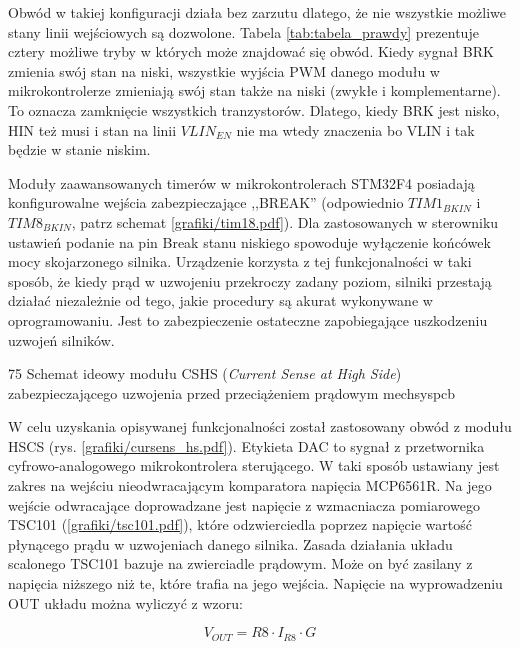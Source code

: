 Obwód w takiej konfiguracji działa bez zarzutu dlatego, że nie wszystkie możliwe stany linii wejściowych są dozwolone. Tabela \ref{tab:tabela_prawdy} prezentuje cztery możliwe tryby w których może znajdować się obwód. Kiedy sygnał BRK zmienia swój stan na niski, wszystkie wyjścia PWM danego modułu w mikrokontrolerze zmieniają swój stan także na niski (zwykłe i komplementarne). To oznacza zamknięcie wszystkich tranzystorów. Dlatego, kiedy BRK jest nisko, HIN też musi i stan na linii $ VLIN_{EN} $ nie ma wtedy znaczenia bo VLIN i tak będzie w stanie niskim.

\clearpage


Moduły zaawansowanych timerów w mikrokontrolerach STM32F4 posiadają konfigurowalne wejścia zabezpieczające ,,BREAK'' (odpowiednio $ TIM1_{BKIN} $ i $ TIM8_{BKIN} $, patrz schemat \ref{grafiki/tim18.pdf}). Dla zastosowanych w sterowniku ustawień podanie na pin Break stanu niskiego spowoduje wyłączenie końcówek mocy skojarzonego silnika. Urządzenie korzysta z tej funkcjonalności w taki sposób, że kiedy prąd w uzwojeniu przekroczy zadany poziom, silniki przestają działać niezależnie od tego, jakie procedury są akurat wykonywane w oprogramowaniu. Jest to zabezpieczenie ostateczne zapobiegające uszkodzeniu uzwojeń silników.

	{75}
	{Schemat ideowy modułu CSHS ({\it Current Sense at High Side}) zabezpieczającego uzwojenia przed przeciążeniem prądowym}
	{mechsyspcb}
	
W celu uzyskania opisywanej funkcjonalności został zastosowany obwód z modułu HSCS (rys. \ref{grafiki/cursens_hs.pdf}). Etykieta DAC to sygnał z przetwornika cyfrowo-analogowego mikrokontrolera sterującego. W taki sposób ustawiany jest zakres na wejściu nieodwracającym komparatora napięcia MCP6561R. Na jego wejście odwracające doprowadzane jest napięcie z wzmacniacza pomiarowego TSC101 (\ref{grafiki/tsc101.pdf}), które odzwierciedla poprzez napięcie wartość płynącego prądu w uzwojeniach danego silnika. Zasada działania układu scalonego TSC101 bazuje na zwierciadle prądowym. Może on być zasilany z napięcia niższego niż te, które trafia na jego wejścia. Napięcie na wyprowadzeniu OUT układu można wyliczyć z wzoru:

\begin{equation} \label{eq:mainboard1}
	V_{OUT} = R8 \cdot I_{R8} \cdot G
\end{equation}

